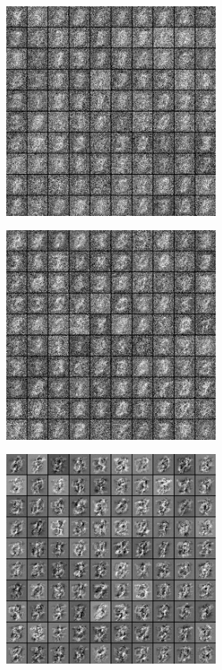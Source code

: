 \documentclass[a4paper]{scrartcl}
\begin{document}
\begin{minipage}[t]{0.5\textwidth}
\includegraphics[width=7cm]{images/filtry_5epoch_50train.png}
\end{minipage}
\begin{minipage}[t]{0.5\textwidth}
\includegraphics[width=7cm]{images/filtry_10epoch_50train.png}
\end{minipage}
\begin{minipage}[t]{0.5\textwidth}
\includegraphics[width=7cm]{images/filters_epoch500_train50.png}
\end{minipage}
\end{document}
